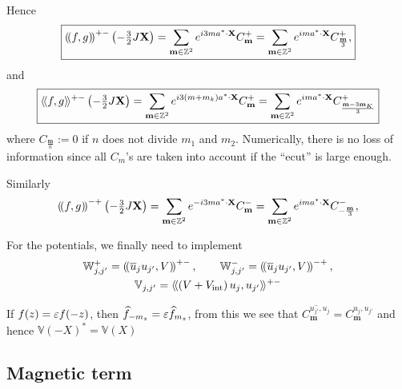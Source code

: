 \documentclass[11pt,a4paper,reqno,french,tikz]{amsart}
\newcommand{\pa}[1]{\left( #1 \right)} %
\newcommand{\f}[2]{\frac{#1}{#2}} %
\newcommand{\ind}[1]{_{\textup{#1}}} %
\newcommand{\bbV}{\mathbb{V}}
\newcommand{\db}[1]{\left(\!\left( #1 \right)\!\right)}
\def\bX{{\mathbf X}}
\def\bmm{{\mathbf m}}
\def\bbV{{\mathbb V}}
\def\bbW{{\mathbb W}}
\def\lAngle{\langle\!\langle}
\def\rAngle{\rangle\!\rangle}
\begin{document}
Hence
\begin{align*}
\boxed{\db{f,g}^{+-}\pa{-\tfrac{3}{2} J \bX} =  \sum_{\bmm \in \Z^2} e^{i 3 ma^* \cdot \bX} C^+_\bmm=  \sum_{\bmm \in \Z^2} e^{i m a^* \cdot \bX} C^+_{\f{\bmm}{3}},}
\end{align*}
and
\begin{align*}
\boxed{\lAngle f,g \rAngle^{+-}\pa{-\tfrac{3}{2} J\bX} =  \sum_{\bmm \in \Z^2} e^{i 3 \pa{m+m_k}a^* \cdot \bX} C^+_\bmm =  \sum_{\bmm \in \Z^2} e^{i m a^* \cdot \bX} C^+_{\f{\bmm-3\bmm_K}{3}}}
\end{align*}
where $C_{\f{\bmm}{n}} := 0$ if $n$ does not divide $m_1$ and $m_2$. Numerically, there is no loss of information since all $C_m$'s are taken into account if the ``ecut'' is large enough.

Similarly
\begin{align*}
\db{f,g}^{-+}\pa{-\tfrac{3}{2} J \bX} =  \sum_{\bmm \in \Z^2} e^{-i 3 ma^* \cdot \bX} C^-_\bmm=  \sum_{\bmm \in \Z^2} e^{i m a^* \cdot \bX} C^-_{-\f{\bmm}{3}},
\end{align*}

For the potentials, we finally need to implement
\begin{multline*}
\bbW_{j,j'}^+ = \db{\overline{u}_j u_{j'}, V}^{+-}, \qquad \bbW_{j,j'}^- = \db{\overline{u}_j u_{j'}, V}^{-+},\\
\bbV_{j,j'} = \lAngle \pa{V+V\ind{int}} u_j , u_{j'} \rAngle^{+-}
\end{multline*}


If $f(z) = \varepsilon f(-z)$, then $\widehat{f}_{-m_z} = \varepsilon \widehat{f}_{m_z}$, from this we see that $\overline{C_\bmm^{u_{j'},u_{j}}} = C_\bmm^{u_{j},u_{j'}}$ and hence $\bbV(-X)^* = \bbV(X)$

\subsection{Magnetic term}%
\end{document}
